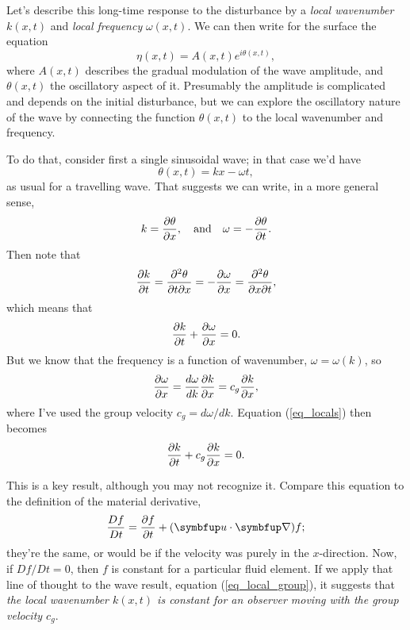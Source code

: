 Let's describe this long-time response to the disturbance by a \emph{local wavenumber} $k(x, t)$ and \emph{local frequency} $\omega(x, t)$.  We can then write for the surface the equation
\begin{equation}
\eta(x, t) = A(x, t) e^{i\theta(x, t)},
\end{equation}
where $A(x, t)$ describes the gradual modulation of the wave amplitude, and $\theta(x, t)$ the oscillatory aspect of it.  Presumably the amplitude is complicated and depends on the initial disturbance, but we can explore the oscillatory nature of the wave by connecting the function $\theta(x, t)$ to the local wavenumber and frequency.

To do that, consider first a single sinusoidal wave; in that case we'd have
\[
\theta(x, t) = kx - \omega t,
\]
as usual for a travelling wave.  That suggests we can write, in a more general sense,
\begin{equation}
k = \frac{\partial {\theta}}{\partial {x}}, \quad \text{and} \quad \omega = -\frac{\partial {\theta}}{\partial {t}}.
\end{equation}
Then note that 
\[
\frac{\partial {k}}{\partial {t}} = \frac{\partial^2 \theta}{\partial t \partial x} = -\frac{\partial {\omega}}{\partial {x}} = \frac{\partial^2 \theta}{\partial x \partial t},
\]
which means that
\begin{equation}
\label{eq_locals}
\frac{\partial {k}}{\partial {t}} + \frac{\partial {\omega}}{\partial {x}} = 0.
\end{equation}
But we know that the frequency is a function of wavenumber, $\omega = \omega(k)$, so
\[
\frac{\partial {\omega}}{\partial {x}} = \frac{d\omega}{dk}\frac{\partial {k}}{\partial {x}} = c_g \frac{\partial {k}}{\partial {x}},
\]
where I've used the group velocity $c_g = d\omega/dk$.  Equation (\ref{eq_locals}) then becomes
\begin{equation}
\label{eq_local_group}
\frac{\partial {k}}{\partial {t}} + c_g \frac{\partial {k}}{\partial {x}} = 0.
\end{equation}

This is a key result, although you may not recognize it.  Compare this equation to the definition of the material derivative,
\[
\frac{Df}{Dt} = \dfdx{f}{t} + (\vec{u} \cdot \grad ) f;
\]
they're the same, or would be if the velocity was purely in the $x$-direction.  Now, if $Df/Dt = 0$, then $f$ is constant for a particular fluid element.  If we apply that line of thought to the wave result, equation (\ref{eq_local_group}), it suggests that \emph{the local wavenumber $k(x, t)$ is constant for an observer moving with the group velocity $c_g$}.

